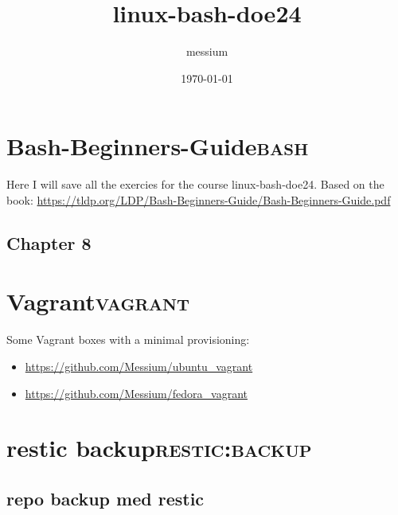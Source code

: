 \documentclass[11pt]{article}
\author{messium}
\date{\today}
\title{linux-bash-doe24}
\begin{document}
\maketitle
\tableofcontents

\section{Bash-Beginners-Guide\hfill{}\textsc{bash}}
\label{sec:org4052777}
Here I will save all the exercies for the course linux-bash-doe24.
Based on the book: \url{https://tldp.org/LDP/Bash-Beginners-Guide/Bash-Beginners-Guide.pdf}
\subsection{Chapter 8}
\label{sec:org119d5d2}
\section{Vagrant\hfill{}\textsc{vagrant}}
\label{sec:orge8c0a4a}
Some Vagrant boxes with a minimal provisioning:
\begin{itemize}
\item \url{https://github.com/Messium/ubuntu\_vagrant}
\item \url{https://github.com/Messium/fedora\_vagrant}
\end{itemize}
\section{restic backup\hfill{}\textsc{restic:backup}}
\label{sec:org57b522d}

\subsection{repo backup med restic}
\label{sec:orga19bcff}
\end{document}
